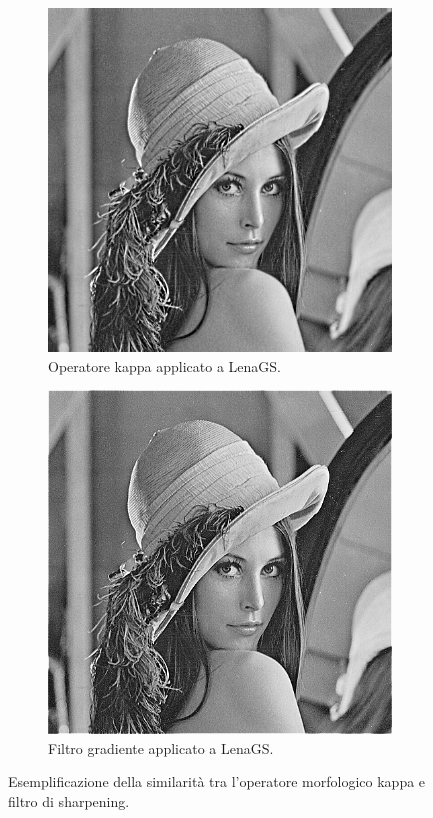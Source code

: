 \documentclass{subfiles}
\begin{document}
\begin{figure}[!h]
    \centering
    \begin{subfigure}[b]{0.4\textwidth}
        \centering
        \includegraphics[scale = 0.3]{../Images/Lena/Lena con operatore kappa.png}
        \caption{Operatore kappa applicato a LenaGS.}
    \end{subfigure}
    \hspace{10pt}
    \begin{subfigure}[b]{0.4\textwidth}
        \centering
        \includegraphics[scale = 0.3]{../Images/Lena/SharpnedLena.png}
        \caption{Filtro gradiente applicato a LenaGS.}
    \end{subfigure}
    \caption{Esemplificazione della similarità tra l'operatore morfologico kappa e filtro di sharpening.}
    \label{fig:7.4}
\end{figure}
\end{document}
